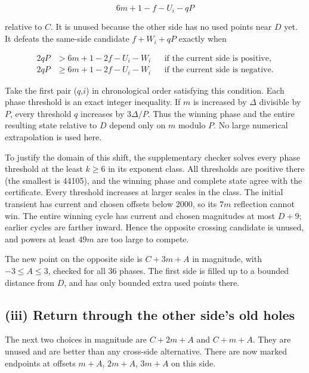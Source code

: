 \documentclass[11pt,a4paper]{article}
\begin{document}
\begin{equation*}
6m+1-f-U_i-qP
\end{equation*}

relative to $C$. It is unused because the other side has no used points near $D$ yet. It defeats the same-side candidate $f+W_i+qP$ exactly when

\begin{equation*}
\begin{aligned}2qP&>6m+1-2f-U_i-W_i&&\text{if the current side is positive},\\2qP&\ge6m+1-2f-U_i-W_i&&\text{if the current side is negative}.\end{aligned}
\end{equation*}

Take the first pair ($q$,$i$) in chronological order satisfying this condition. Each phase threshold is an exact integer inequality. If $m$ is increased by $\Delta$ divisible by $P$, every threshold $q$ increases by $3\Delta/P$. Thus the winning phase and the entire resulting state relative to $D$ depend only on $m$ modulo $P$. No large numerical extrapolation is used here.

To justify the domain of this shift, the supplementary checker solves every phase threshold at the least $k\ge6$ in its exponent class. All thresholds are positive there (the smallest is 44105), and the winning phase and complete state agree with the certificate. Every threshold increases at larger scales in the class. The initial transient has current and chosen offsets below 2000, so its $7m$ reflection cannot win. The entire winning cycle has current and chosen magnitudes at most $D+9$; earlier cycles are farther inward. Hence the opposite crossing candidate is unused, and powers at least $49m$ are too large to compete.

The new point on the opposite side is $C+3m+A$ in magnitude, with $-3\le A\le3$, checked for all 36 phases. The first side is filled up to a bounded distance from $D$, and has only bounded extra used points there.

\subsection*{(iii) Return through the other side's old holes}

The next two choices in magnitude are $C+2m+A$ and $C+m+A$. They are unused and are better than any cross-side alternative. There are now marked endpoints at offsets $m+A$, $2m+A$, $3m+A$ on this side.
\end{document}
